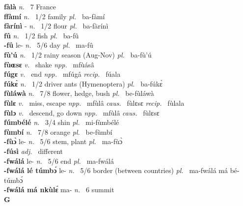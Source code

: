 \noindent
{\bfseries fàlà}  {\itshape n.~} 7 France    \\ 
{\bfseries ffàmí}  {\itshape n.~} 1/2 family {\itshape pl.~} ba-fàmí    \\ 
{\bfseries fàrínì} - {\itshape n.~} 1/2 flour {\itshape pl.~} ba-fàrínì    \\ 
{\bfseries fû}  {\itshape n.~} 1/2 fish {\itshape pl.~} ba-fû    \\ 
{\bfseries -fû} le- {\itshape n.~} 5/6 day {\itshape pl.~} ma-fû    \\ 
{\bfseries fù'ú}  {\itshape n.~} 1/2 rainy season (Aug-Nov) {\itshape pl.~} ba-fù'ú    \\ 
{\bfseries fùɶsɛ}  {\itshape v.~} shake   {\itshape npp.~} mfùásâ  \\ 
{\bfseries fúgɛ}  {\itshape v.~} end   {\itshape npp.~} mfúgâ {\itshape recip.~} fúala  \\ 
{\bfseries fúkɛ̀}  {\itshape n.~} 1/2 driver ants (Hymenoptera) {\itshape pl.~} ba-fúkɛ̀    \\ 
{\bfseries fùláwà}  {\itshape n.~} 7/8 flower, hedge, bush {\itshape pl.~} be-fùláwà    \\ 
{\bfseries fùlɛ}  {\itshape v.~} miss, escape   {\itshape npp.~} mfùlâ {\itshape caus.~} fùlɛsɛ {\itshape recip.~} fùlala  \\ 
{\bfseries fùlɔ}  {\itshape v.~} descend, go down   {\itshape npp.~} mfùlâ {\itshape caus.~} fùlɛsɛ  \\ 
{\bfseries fúmbélé}  {\itshape n.~} 3/4 shin {\itshape pl.~} mi-fùmbélé    \\ 
{\bfseries fùmbí}  {\itshape n.~} 7/8 orange {\itshape pl.~} be-fùmbí    \\ 
{\bfseries -fùɔ̀} le- {\itshape n.~} 5/6 stem, plant {\itshape pl.~} ma-fùɔ̀    \\ 
{\bfseries -fúsì}  {\itshape adj.~} different    \\ 
{\bfseries -fwálá} le- {\itshape n.~} 5/6 end {\itshape pl.~} ma-fwálá    \\ 
{\bfseries -fwálá lé túmbɔ́} le- {\itshape  n.~} 5/6 border (between countries) {\itshape pl.~} ma-fwálá má bé-túmbɔ́   \\ 
{\bfseries -fwálá má nkùlɛ́} ma- {\itshape n.~} 6 summit    \\ 

\medskip
\noindent \large {\bfseries G}\normalsize\\
\medskip

